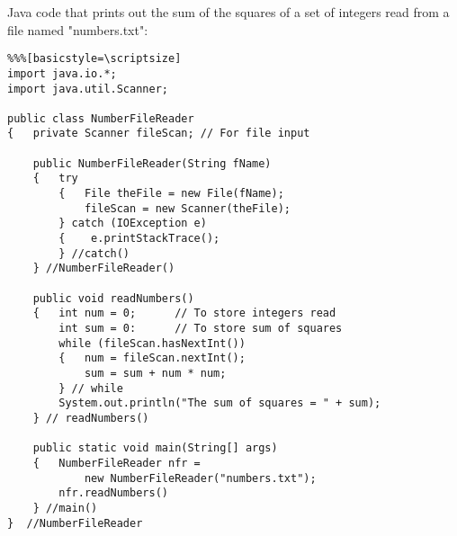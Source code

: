 \begin{ANS}
\pagebreak
\item
Java code that prints out the sum of the
squares of a set of integers read from a file named "numbers.txt":

\begin{jjjlisting}
\begin{lstlisting}%%%[basicstyle=\scriptsize]
import java.io.*;
import java.util.Scanner;

public class NumberFileReader
{   private Scanner fileScan; // For file input
   
    public NumberFileReader(String fName)
    {   try
        {   File theFile = new File(fName);
            fileScan = new Scanner(theFile);
        } catch (IOException e)
        {    e.printStackTrace();
        } //catch()
    } //NumberFileReader() 

    public void readNumbers()
    {   int num = 0;      // To store integers read
        int sum = 0:      // To store sum of squares
        while (fileScan.hasNextInt()) 
        {   num = fileScan.nextInt();
            sum = sum + num * num;
        } // while
        System.out.println("The sum of squares = " + sum);
    } // readNumbers()

    public static void main(String[] args)
    {   NumberFileReader nfr =
            new NumberFileReader("numbers.txt");
        nfr.readNumbers()
    } //main()
}  //NumberFileReader 
\end{lstlisting}
\end{jjjlisting}

\end{ANS}

\label{exercises}

